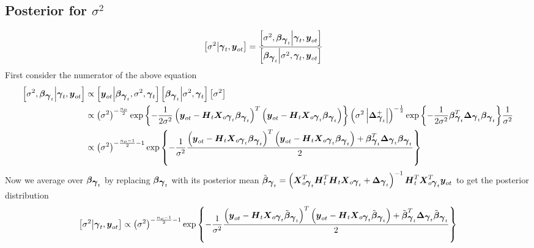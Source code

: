 \documentclass[fleqn]{article}
\def\bm#1{\mbox{\boldmath $#1$}}
\begin{document}
\subsection{Posterior for $\sigma^2$}
%
\begin{align*}
%
\left[ \sigma^2 \middle| \bm{\gamma}_t, \bm{y}_{o t} \right] & = \frac{\left[ \sigma^2, \bm{\beta}_{\bm{\gamma}_t} \middle| \bm{\gamma}_t, \bm{y}_{o t} \right]} {\left[ \bm{\beta}_{\bm{\gamma}_t} \middle| \sigma^2, \bm{\gamma}_t, \bm{y}_{o t} \right]}
%
\end{align*}
%
First consider the numerator of the above equation
%
\begin{align*}
%
\left[ \sigma^2, \bm{\beta}_{\bm{\gamma}_t} \middle| \bm{\gamma}_t, \bm{y}_{o t} \right] & \propto \left[ \bm{y}_{o t} \middle| \bm{\beta}_{\bm{\gamma}_t}, \sigma^2, \bm{\gamma}_t \right] \left[ \bm{\beta}_{\bm{\gamma}_t} \middle| \sigma^2, \bm{\gamma}_t \right] \left[ \sigma^2 \right]\\
%
& \propto \left( \sigma^2 \right)^{ - \frac{n_o} {2}} \exp{ \left\{ - \frac{1} {2 \sigma^2} \left( \bm{y}_{o t} - \bm{H}_t \bm{X}_{o \bm{\gamma}_t} \bm{\beta}_{\bm{\gamma}_t} \right)^T \left( \bm{y}_{o t} - \bm{H}_t \bm{X}_{o \bm{\gamma}_t} \bm{\beta}_{\bm{\gamma}_t} \right) \right\} } \left( \sigma^2 \left| \bm{\Delta}_{\bm{\gamma}_t}^+ \right| \right)^{ - \frac{1} {2}} \exp{ \left\{ - \frac{1} {2 \sigma^2} \bm{\beta}_{\bm{\gamma}_t}^T \bm{\Delta}_{\bm{\gamma}_t} \bm{\beta}_{\bm{\gamma}_t} \right\} } \frac{1} {\sigma^2}\\
%
& \propto \left( \sigma^2 \right)^{ - \frac{n_o - 1} {2} - 1} \exp{ \left\{ - \frac{1} {\sigma^2} \frac{ \left( \bm{y}_{o t} - \bm{H}_t \bm{X}_{o \bm{\gamma}_t} \bm{\beta}_{\bm{\gamma}_t} \right)^T \left( \bm{y}_{o t} - \bm{H}_t \bm{X}_{o \bm{\gamma}_t} \bm{\beta}_{\bm{\gamma}_t} \right) + \bm{\beta}_{\bm{\gamma}_t}^T \bm{\Delta}_{\bm{\gamma}_t} \bm{\beta}_{\bm{\gamma}_t} } {2} \right\} } \\
%
\end{align*}
%
Now we average over $\bm{\beta}_{\bm{\gamma}_t}$ by replacing $\bm{\beta}_{\bm{\gamma}_t}$ with its posterior mean $\tilde{\bm{\beta}}_{\bm{\gamma}_t} = \left( \bm{X}_{o \bm{\gamma}_t}^T \bm{H}_t^T \bm{H}_t \bm{X}_{o \bm{\gamma}_t} + \bm{\Delta}_{\bm{\gamma}_t} \right)^{ - 1} \bm{H}_t^T \bm{X}_{o \bm{\gamma}_t}^T \bm{y}_{o t}$ to get the posterior distribution
%
\begin{align*}
%
\left[ \sigma^2 \middle| \bm{\gamma}_t, \bm{y}_{o t} \right] & \propto  \left( \sigma^2 \right)^{ - \frac{n_o - 1} {2} - 1} \exp{ \left\{ - \frac{1} {\sigma^2} \frac{ \left( \bm{y}_{o t} - \bm{H}_t \bm{X}_{o \bm{\gamma}_t} \tilde{\bm{\beta}}_{\bm{\gamma}_t} \right)^T \left( \bm{y}_{o t} - \bm{H}_t \bm{X}_{o \bm{\gamma}_t} \tilde{\bm{\beta}}_{\bm{\gamma}_t} \right) + \tilde{\bm{\beta}}_{\bm{\gamma}_t}^T \bm{\Delta}_{\bm{\gamma}_t} \tilde{\bm{\beta}}_{\bm{\gamma}_t} } {2} \right\} } \\
%
\end{align*}  
\end{document}
